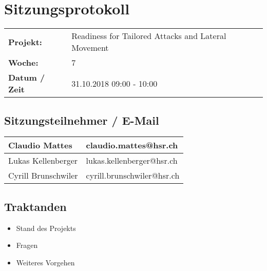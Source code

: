 \newcommand{\TITLE}{Readiness for Tailored Attacks and Lateral Movement Detection}
\newcommand{\REVIEW}{Weekly Meeting}
\newcommand{\VERSION}{0.0}





\section*{Sitzungsprotokoll}

\begin{tabular}{p{4cm} p{12cm}}
    \textbf{Projekt:} & Readiness for Tailored Attacks and Lateral Movement  \\
    \textbf{Woche:} & 7 \\
    \textbf{Datum / Zeit} & 31.10.2018 09:00 - 10:00 \\
\end{tabular}

\subsection*{Sitzungsteilnehmer / E-Mail}
\begin{table}[H]
    \centering
    \begin{tabular}{p{4cm} p{12cm}} \hline
        Claudio Mattes & claudio.mattes@hsr.ch \\ \hline
        Lukas Kellenberger & lukas.kellenberger@hsr.ch \\ \hline
        Cyrill Brunschwiler & cyrill.brunschwiler@hsr.ch \\ \hline
    \end{tabular}
\end{table}

\vspace{1cm}

\subsection*{Traktanden}
\begin{itemize}
    \item Stand des Projekts
    \item Fragen
    \item Weiteres Vorgehen
\end{itemize}

\clearpage


